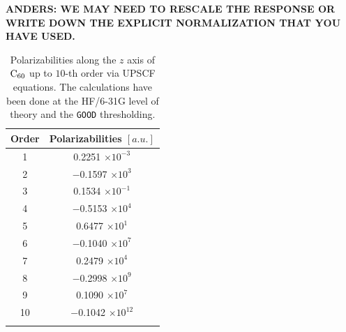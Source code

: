 \documentclass[prl,aps,letterpaper,twocolumn,showpacs,twocolumngrid,superbib]{revtex4}
\begin{document}
{\bf ANDERS: WE MAY NEED TO RESCALE THE RESPONSE OR 
 WRITE DOWN THE EXPLICIT NORMALIZATION THAT YOU HAVE USED.}
\begin{table}[t]
  \centering
  \caption{\protect 
    Polarizabilities along the $z$ axis of $\rm C_{60}$ up 
    to $10$-th order via UPSCF equations.
    The calculations have been done at the HF/6-31G level of 
    theory and the {\tt GOOD} thresholding.
  }\label{tab:C60_Values}
  \begin{tabular}{cc}
    \toprule
    Order & Polarizabilities $[a.u.]$\\
    \hline
     1 &    0.2251 $\times 10^{-3}$\\
     2 & $-$0.1597 $\times 10^{3}$\\
     3 &    0.1534 $\times 10^{-1}$\\
     4 & $-$0.5153 $\times 10^{4}$\\
     5 &    0.6477 $\times 10^{1}$\\
     6 & $-$0.1040 $\times 10^{7}$\\
     7 &    0.2479 $\times 10^{4}$\\
     8 & $-$0.2998 $\times 10^{9}$\\
     9 &    0.1090 $\times 10^{7}$\\
    10 & $-$0.1042 $\times 10^{12}$\\
    \botrule
  \end{tabular}
\end{table}
\end{document}
